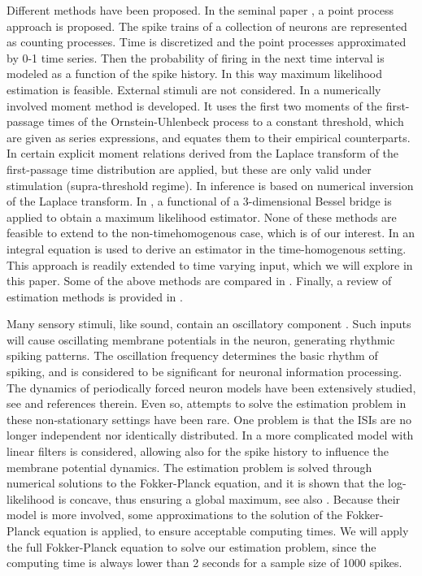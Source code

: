 Different methods have been
proposed. In the seminal paper \cite{Brillinger1988}, a point process approach
is proposed. The spike trains of a collection of neurons are 
represented as counting processes. Time is discretized and the point processes
approximated by 0-1 time series. Then the probability of firing in the
next time interval is modeled as a function of the
spike history. In this way maximum likelihood
estimation is feasible. External stimuli are not considered. 
In \cite{Inoue1995} a numerically involved moment method is
developed. It uses the first two moments of the first-passage times of
the Ornstein-Uhlenbeck process to a constant threshold, which are
given as series expressions, and equates them to their empirical
counterparts. In
\cite{DitlevsenLansky2005,DitlevsenLansky2006} certain explicit 
moment relations derived from the Laplace transform of the first-passage time
distribution are applied, but these are only valid under 
stimulation (supra-threshold regime). In
\cite{MullowneyIyengar2008} inference is based on numerical inversion of the Laplace transform. In \cite{Zhangetal2009}, a
functional of a 3-dimensional Bessel bridge is applied to obtain a maximum
likelihood estimator. None of these methods
are feasible to extend to the
non-timehomogenous case, which is of our interest. In \cite{Ditlevsen2008,Ditlevsen2007} an
integral equation is used to derive an estimator in the
time-homogenous setting. This approach is readily extended to time
varying input, which we will explore in this paper. Some of the above methods are compared in
\cite{Ditlevsen2008a}. Finally, a review of estimation methods is provided in
\cite{Lansky2008}. 

Many sensory stimuli, like sound, contain an oscillatory component
\cite{Braunetal1994,Chacron2000}. Such inputs will cause oscillating membrane
potentials in the neuron, generating rhythmic spiking patterns. The oscillation
frequency determines the basic rhythm of spiking, and is considered to be
significant for neuronal information processing. The dynamics of periodically
forced neuron models have been extensively studied, see
\cite{Bulsaraetal1996,Burkitt2006b,Lansky1997,Longtingetal1994,SacerdoteGiraudo2013,Shimokawa2000}
and references therein. Even so, attempts to solve the estimation problem in
these non-stationary settings have been rare. One problem is that the ISIs are
no longer independent nor identically distributed. In
\cite{Paninski2004} a more complicated model with linear filters is considered, allowing
also for the spike history to influence the membrane potential
dynamics. The estimation problem is solved through numerical solutions to the
Fokker-Planck equation, and it is shown that the log-likelihood is
concave, thus ensuring a global maximum, see also
\cite{Dong2011,Sirovich2011a}. Because their model is more involved,
some approximations to the solution of the Fokker-Planck equation is
applied, to ensure acceptable computing times. We will apply the full 
Fokker-Planck equation to solve our estimation problem, since the
computing time is always lower than 2 seconds for a sample size of
1000 spikes.   
  

